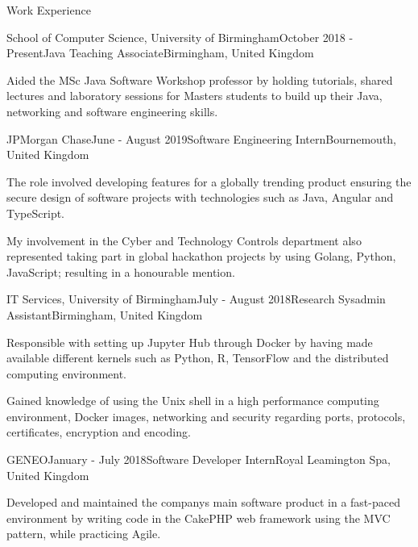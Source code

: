 \documentclass{resume} %
\begin{document}
\begin{rSection}{Work Experience}

\begin{rSubsection}{School of Computer Science, University of Birmingham}{October 2018 - Present}{Java Teaching Associate}{Birmingham, United Kingdom}
\item Aided the MSc Java Software Workshop professor by holding tutorials, shared lectures and laboratory sessions for Masters students to build up their Java, networking and software engineering skills.
\end{rSubsection}

\begin{rSubsection}{JPMorgan Chase}{June - August 2019}{Software Engineering Intern}{Bournemouth, United Kingdom}
\item The role involved developing features for a globally trending product ensuring the secure design of software projects with technologies such as Java, Angular and TypeScript.
\item My involvement in the Cyber and Technology Controls department also represented taking part in global hackathon projects by using Golang, Python, JavaScript; resulting in a honourable mention.
\end{rSubsection}

\begin{rSubsection}{IT Services, University of Birmingham}{July - August 2018}{Research Sysadmin Assistant}{Birmingham, United Kingdom}
\item Responsible with setting up Jupyter Hub through Docker by having made available different kernels such as Python, R, TensorFlow and the distributed computing environment.
\item Gained knowledge of using the Unix shell in a high performance computing environment, Docker images, networking and security regarding ports, protocols, certificates, encryption and encoding.
\end{rSubsection}

\begin{rSubsection}{GENEO}{January - July 2018}{Software Developer Intern}{Royal Leamington Spa, United Kingdom}
\item Developed and maintained the company\textsc{}s main software product in a fast-paced environment by writing code in the CakePHP web framework using the MVC pattern, while practicing Agile.
\end{rSubsection}


\end{rSection}
\end{document}
